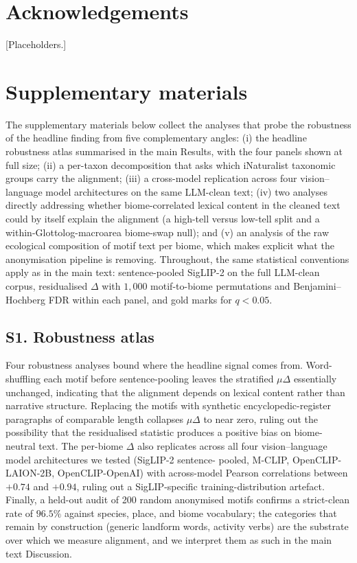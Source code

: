 \documentclass[11pt,a4paper]{article}
\begin{document}
\section*{Acknowledgements}
[Placeholders.]



\appendix
\section*{Supplementary materials}\label{app:supp}

The supplementary materials below collect the analyses that probe
the robustness of the headline finding from five complementary
angles: (i) the headline robustness atlas summarised in the main
Results, with the four panels shown at full size; (ii) a
per-taxon decomposition that asks which iNaturalist taxonomic
groups carry the alignment; (iii) a cross-model replication
across four vision--language model architectures on the same
LLM-clean text; (iv) two analyses directly addressing whether
biome-correlated lexical content in the cleaned text could by
itself explain the alignment (a high-tell versus low-tell split
and a within-Glottolog-macroarea biome-swap null); and (v) an
analysis of the raw ecological composition of motif text per
biome, which makes explicit what the anonymisation pipeline is
removing. Throughout, the same statistical conventions apply as
in the main text: sentence-pooled SigLIP-2 on the full LLM-clean
corpus, residualised $\Delta$ with $1{,}000$ motif-to-biome
permutations and Benjamini--Hochberg FDR within each panel, and
gold marks for $q < 0.05$.

\subsection*{S1. Robustness atlas}

Four robustness analyses bound where the headline signal comes
from. Word-shuffling each motif before sentence-pooling leaves
the stratified $\mu\Delta$ essentially unchanged, indicating that
the alignment depends on lexical content rather than narrative
structure. Replacing the motifs with synthetic
encyclopedic-register paragraphs of comparable length collapses
$\mu\Delta$ to near zero, ruling out the possibility that the
residualised statistic produces a positive bias on biome-neutral
text. The per-biome $\Delta$ also replicates across all four
vision--language model architectures we tested (SigLIP-2 sentence-
pooled, M-CLIP, OpenCLIP-LAION-2B, OpenCLIP-OpenAI) with
across-model Pearson correlations between $+0.74$ and $+0.94$,
ruling out a SigLIP-specific training-distribution artefact.
Finally, a held-out audit of 200 random anonymised motifs
confirms a strict-clean rate of $96.5\%$ against species, place,
and biome vocabulary; the categories that remain by construction
(generic landform words, activity verbs) are the substrate over
which we measure alignment, and we interpret them as such in the
main text Discussion.
\end{document}
